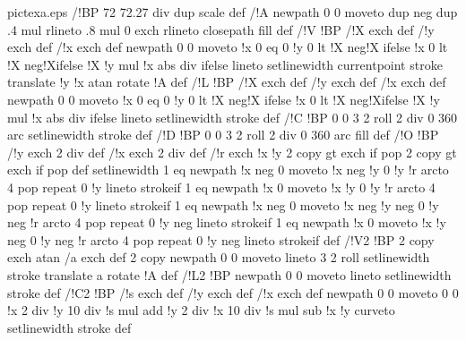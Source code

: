 \begin{filecontents*}{pictexa.eps}
/!BP{
  72 72.27 div dup scale
  }def
/!A{
  newpath
  0 0 moveto
  dup neg dup .4 mul rlineto
  .8 mul 0 exch  rlineto
  closepath
  fill
  } def
/!V{
  !BP
  /!X exch def
  /!y exch def
  /!x exch def
  newpath
  0 0 moveto
  !x 0 eq {0  !y 0 lt {!X neg}{!X} ifelse}
         {!x 0 lt {!X neg}{!X}ifelse  !X !y mul !x abs div} ifelse
  lineto
  setlinewidth  %
  currentpoint
  stroke
  translate
  !y !x atan
  rotate
  !A            %
  }def
/!L{
  !BP
  /!X exch def
  /!y exch def
  /!x exch def
  newpath
  0 0 moveto
  !x 0 eq {0  !y 0 lt {!X neg}{!X} ifelse}
         {!x 0 lt {!X neg}{!X}ifelse  !X !y mul !x abs div} ifelse
  lineto
  setlinewidth  %
  stroke
  }def
/!C{
  !BP
  0 0 3 2 roll
  2 div 0 360 arc
  setlinewidth  %
  stroke
  }def
/!D{
  !BP
  0 0 3 2 roll
  2 div 0 360 arc fill
  }def
/!O{
  !BP
  /!y exch 2 div def
  /!x exch 2 div def
  /!r exch !x !y
    2 copy gt {exch} if pop
    2 copy gt {exch} if pop
      def
  setlinewidth  %
  1 eq
  {newpath
   !x neg 0 moveto
   !x neg !y 0 !y !r arcto 4 {pop} repeat
   0 !y lineto
   stroke}if
  1 eq
  {newpath
   !x  0 moveto
   !x  !y 0 !y !r arcto 4 {pop} repeat
   0 !y lineto
   stroke}if
  1 eq
  {newpath
   !x neg 0 moveto
   !x neg !y neg 0 !y neg  !r arcto 4 {pop} repeat
   0 !y neg lineto
   stroke}if
  1 eq
  {newpath
   !x  0 moveto
   !x  !y neg 0 !y neg !r arcto 4 {pop} repeat
   0 !y neg lineto
   stroke}if
  }def
/!V2{
  !BP
  2 copy exch
  atan
  /a exch def
  2 copy
  newpath
  0 0 moveto
  lineto          %
  3 2 roll
  setlinewidth  %
  stroke
  translate       %
  a rotate
  !A                    %
  }def
/!L2{
  !BP
  newpath
  0 0 moveto
  lineto          %
  setlinewidth  %
  stroke
  }def
/!C2{
  !BP
  /!s exch def
  /!y exch def
  /!x exch def
  newpath
  0 0 moveto
  0 0
  !x 2 div !y 10 div !s mul add
  !y 2 div  !x 10 div  !s mul sub
  !x !y
  curveto
  setlinewidth  %
  stroke
  }def


\end{filecontents*}

